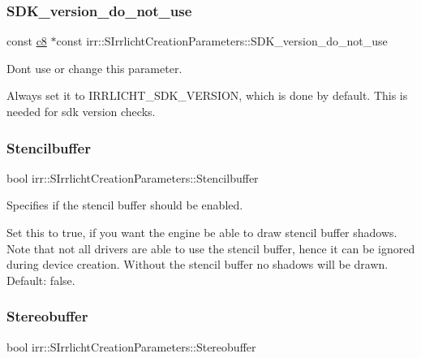 \subsubsection{\texorpdfstring{S\+D\+K\+\_\+version\+\_\+do\+\_\+not\+\_\+use}{SDK\_version\_do\_not\_use}}
{\footnotesize\ttfamily const \hyperlink{namespaceirr_a9395eaea339bcb546b319e9c96bf7410}{c8} $\ast$const irr\+::\+S\+Irrlicht\+Creation\+Parameters\+::\+S\+D\+K\+\_\+version\+\_\+do\+\_\+not\+\_\+use}



Don\textquotesingle{}t use or change this parameter. 

Always set it to I\+R\+R\+L\+I\+C\+H\+T\+\_\+\+S\+D\+K\+\_\+\+V\+E\+R\+S\+I\+ON, which is done by default. This is needed for sdk version checks. \mbox{\label{structirr_1_1SIrrlichtCreationParameters_a8120cfeac3fbf8b12b1e5f6bd6a8ec2f}} 
\subsubsection{\texorpdfstring{Stencilbuffer}{Stencilbuffer}}
{\footnotesize\ttfamily bool irr\+::\+S\+Irrlicht\+Creation\+Parameters\+::\+Stencilbuffer}



Specifies if the stencil buffer should be enabled. 

Set this to true, if you want the engine be able to draw stencil buffer shadows. Note that not all drivers are able to use the stencil buffer, hence it can be ignored during device creation. Without the stencil buffer no shadows will be drawn. Default\+: false. \mbox{\label{structirr_1_1SIrrlichtCreationParameters_ae5dd722bd6c5a7001b73ef92264220a5}} 
\subsubsection{\texorpdfstring{Stereobuffer}{Stereobuffer}}
{\footnotesize\ttfamily bool irr\+::\+S\+Irrlicht\+Creation\+Parameters\+::\+Stereobuffer}




